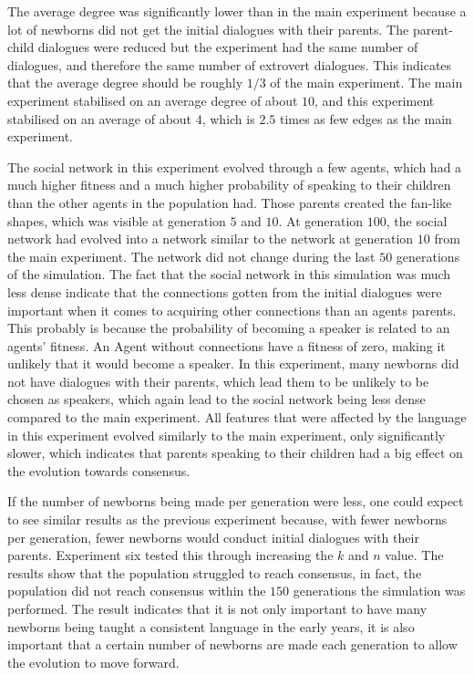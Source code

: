 The average degree was significantly lower than in the main experiment because a lot of newborns did not get the initial dialogues with their parents. The parent-child dialogues were reduced but the experiment had the same number of dialogues, and therefore the same number of extrovert dialogues. This indicates that the average degree should be roughly $1/3$ of the main experiment. The main experiment stabilised on an average degree of about $10$, and this experiment stabilised on an average of about $4$, which is $2.5$ times as few edges as the main experiment. 

The social network in this experiment evolved through a few agents, which had a much higher fitness and a much higher probability of speaking to their children than the other agents in the population had. Those parents created the fan-like shapes, which was visible at generation $5$ and $10$. At generation $100$, the social network had evolved into a network similar to the network at generation $10$ from the main experiment. The network did not change during the last $50$ generations of the simulation. The fact that the social network in this simulation was much less dense indicate that the connections gotten from the initial dialogues were important when it comes to acquiring other connections than an agents parents. This probably is because the probability of becoming a speaker is related to an agents' fitness. An Agent without connections have a fitness of zero, making it unlikely that it would become a speaker. In this experiment, many newborns did not have dialogues with their parents, which lead them to be unlikely to be chosen as speakers, which again lead to the social network being less dense compared to the main experiment. All features that were affected by the language in this experiment evolved similarly to the main experiment, only significantly slower, which indicates that parents speaking to their children had a big effect on the evolution towards consensus.

If the number of newborns being made per generation were less, one could expect to see similar results as the previous experiment because, with fewer newborns per generation, fewer newborns would conduct initial dialogues with their parents. Experiment six tested this through increasing the $k$ and $n$ value. The results show that the population struggled to reach consensus, in fact, the population did not reach consensus within the $150$ generations the simulation was performed. The result indicates that it is not only important to have many newborns being taught a consistent language in the early years, it is also important that a certain number of newborns are made each generation to allow the evolution to move forward. 

